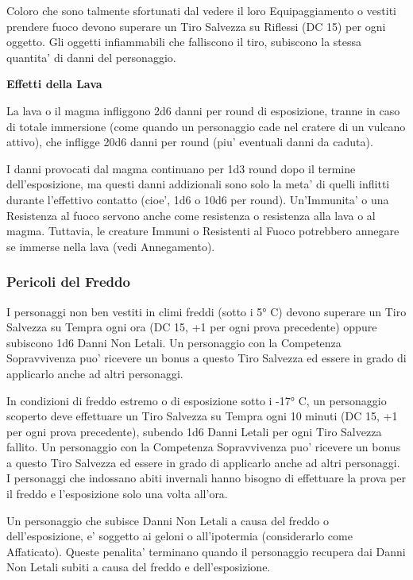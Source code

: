 \documentclass[a4paper,11pt,twoside,openany]{book}
\begin{document}
{Coloro che sono talmente sfortunati dal vedere il loro Equipaggiamento o vestiti prendere fuoco devono superare un Tiro Salvezza su Riflessi (DC 15) per ogni oggetto. Gli oggetti infiammabili che falliscono il tiro, subiscono la stessa quantita' di danni del personaggio.

\medskip

\textbf{Effetti della Lava}

La lava o il magma infliggono 2d6 danni per round di esposizione, tranne in caso di totale immersione (come quando un personaggio cade nel cratere di un vulcano attivo), che infligge 20d6 danni per round (piu' eventuali danni da caduta).

I danni provocati dal magma continuano per 1d3 round dopo il termine dell'esposizione, ma questi danni addizionali sono solo la meta' di quelli inflitti durante l'effettivo contatto (cioe', 1d6 o 10d6 per round). Un'Immunita' o una Resistenza al fuoco servono anche come resistenza o resistenza alla lava o al magma. Tuttavia, le creature Immuni o Resistenti al Fuoco potrebbero annegare se immerse nella lava (vedi Annegamento).


\subsubsection{Pericoli del Freddo}

\label{pericoli-del-freddo}

I personaggi non ben vestiti in climi freddi (sotto i 5° C) devono superare un Tiro Salvezza su Tempra ogni ora (DC 15, +1 per ogni prova precedente) oppure subiscono 1d6 Danni Non Letali. Un personaggio con la Competenza Sopravvivenza puo' ricevere un bonus a questo Tiro Salvezza ed essere in grado di applicarlo anche ad altri personaggi.

In condizioni di freddo estremo o di esposizione sotto i -17° C, un personaggio scoperto deve effettuare un Tiro Salvezza su Tempra ogni 10 minuti (DC 15, +1 per ogni prova precedente), subendo 1d6 Danni Letali per ogni Tiro Salvezza fallito. Un personaggio con la Competenza Sopravvivenza puo' ricevere un bonus a questo Tiro Salvezza ed essere in grado di applicarlo anche ad altri personaggi. I personaggi che indossano abiti invernali hanno bisogno di effettuare la prova per il freddo e l'esposizione solo una volta all'ora.

Un personaggio che subisce Danni Non Letali a causa del freddo o dell'esposizione, e' soggetto ai geloni o all'ipotermia (considerarlo come Affaticato). Queste penalita' terminano quando il personaggio recupera dai Danni Non Letali subiti a causa del freddo e dell'esposizione. 

}
\end{document}
